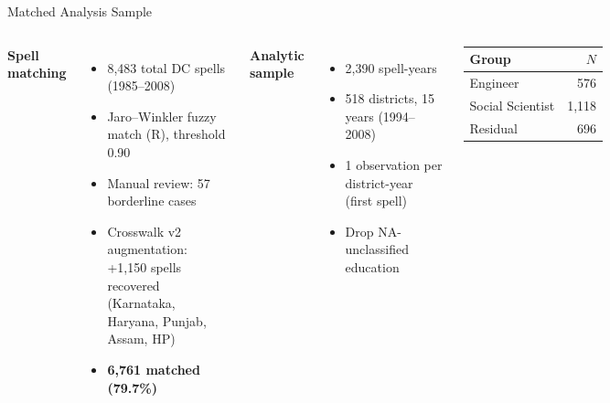 \documentclass[aspectratio=169,10pt]{beamer}
\begin{document}
\begin{frame}{Matched Analysis Sample}
  \begin{columns}[T]
    \textbf{Spell matching}
    \begin{itemize}
      \item 8{,}483 total DC spells (1985--2008)
      \item Jaro--Winkler fuzzy match (R), threshold 0.90
      \item Manual review: 57 borderline cases
      \item Crosswalk v2 augmentation: +1{,}150 spells recovered\\
            (Karnataka, Haryana, Punjab, Assam, HP)
      \item \textbf{6{,}761 matched (79.7\%)}
    \end{itemize}
    \textbf{Analytic sample}
    \begin{itemize}
      \item 2{,}390 spell-years
      \item 518 districts, 15 years (1994--2008)
      \item 1 observation per district-year (first spell)
      \item Drop NA-unclassified education
    \end{itemize}
    \vspace{6pt}
    \begin{tabular}{lr}
      \toprule
      Group & $N$ \\
      \midrule
      Engineer         & 576 \\
      Social Scientist & 1{,}118 \\
      Residual         & 696 \\
      \bottomrule
    \end{tabular}
  \end{columns}
\end{frame}
\end{document}
